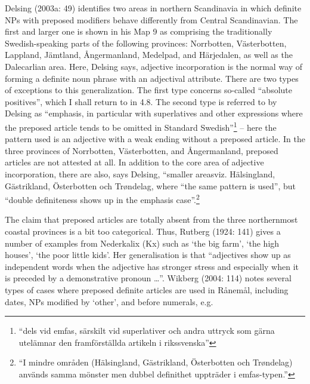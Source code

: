 Delsing (2003a: 49) identifies two areas in northern Scandinavia in which definite NPs with preposed modifiers behave differently from Central Scandinavian. The first and larger one is shown in his Map 9 as comprising the traditionally Swedish-speaking parts of the following provinces: Norrbotten, Västerbotten, Lappland, Jämtland, Ångermanland, Medelpad, and Härjedalen, as well as the Dalecarlian area. Here, Delsing says, adjective incorporation is the normal way of forming a definite noun phrase with an adjectival attribute. There are two types of exceptions to this generalization. The first type concerns so-called “absolute positives”, which I shall return to in 4.8. The second type is referred to by Delsing as “emphasis, in particular with superlatives and other expressions where the preposed article tends to be omitted in Standard Swedish”\footnote{ “dels vid emfas, särskilt vid superlativer och andra uttryck som gärna utelämnar den framförställda artikeln i rikssvenska” } – here the pattern used is an adjective with a weak ending without a preposed article. In the three provinces of Norrbotten, Västerbotten, and Ångermanland, preposed articles are not attested at all. In addition to the core area of adjective incorporation, there are also, says Delsing, “smaller areasviz. Hälsingland, Gästrikland, Österbotten och Trøndelag, where “the same pattern is used”, but “double definiteness shows up in the emphasis case”.\footnote{ “I mindre områden (Hälsingland, Gästrikland, Österbotten och Trøndelag) används samma mönster men dubbel definithet uppträder i emfas-typen.”}

The claim that preposed articles are totally absent from the three northernmost coastal provinces is a bit too categorical. Thus, Rutberg (1924: 141) gives a number of examples from Nederkalix (Kx) such as ‘the big farm’, ‘the high houses’, ‘the poor little kids’. Her generalisation is that “adjectives show up as independent words when the adjective has stronger stress and especially when it is preceded by a demonstrative pronoun …”. Wikberg (2004: 114) notes several types of cases where preposed definite articles are used in Rånemål, including dates, NPs modified by  ‘other’, and before numerals, e.g.

